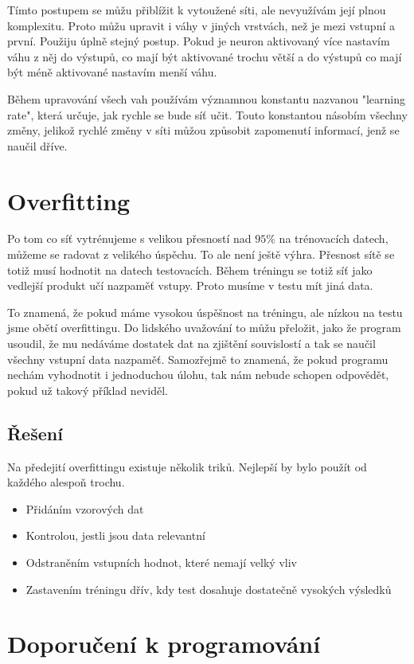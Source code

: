\documentclass[12pt,a4paper]{report}
\begin{document}
	Tímto postupem se můžu přiblížit k vytoužené síti, ale nevyužívám její plnou komplexitu. Proto můžu upravit i váhy v jiných vrstvách, než je mezi vstupní a první. Použiju úplně stejný postup. Pokud je neuron aktivovaný více nastavím váhu z něj do výstupů, co mají být aktivované trochu větší a do výstupů co mají být méně aktivované nastavím menší váhu.
	
	Během upravování všech vah používám významnou konstantu nazvanou "learning rate", která určuje, jak rychle se bude síť učit. Touto konstantou násobím všechny změny, jelikož rychlé změny v síti můžou způsobit zapomenutí informací, jenž se naučil dříve.

\chapter{Overfitting}
Po tom co síť vytrénujeme s velikou přesností nad $95\%$ na trénovacích datech, můžeme se radovat z velikého úspěchu. To ale není ještě výhra. Přesnost sítě se totiž musí hodnotit na datech testovacích. Během tréningu se totiž síť jako vedlejší produkt učí nazpaměť vstupy. Proto musíme v testu mít jiná data.

To znamená, že pokud máme vysokou úspěšnost na tréningu, ale nízkou na testu jsme obětí overfittingu. Do lidského uvažování to můžu přeložit, jako že program usoudil, že mu nedáváme dostatek dat na zjištění souvislostí a tak se naučil všechny vstupní data nazpaměť. Samozřejmě to znamená, že pokud programu nechám vyhodnotit i jednoduchou úlohu, tak nám nebude schopen odpovědět, pokud už takový příklad neviděl.

	\section{Řešení}
	Na předejití overfittingu existuje několik triků. Nejlepší by bylo použít od každého alespoň trochu.
	\begin{itemize}
		\item Přidáním vzorových dat
		\item Kontrolou, jestli jsou data relevantní
		\item Odstraněním vstupních hodnot, které nemají velký vliv
		\item Zastavením tréningu dřív, kdy test dosahuje dostatečně vysokých výsledků
	\end{itemize}
	

\chapter{Doporučení k programování}
\end{document}
